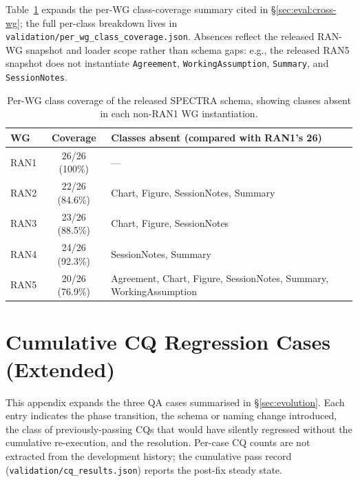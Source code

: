 Table~\ref{tab:perwg-coverage} expands the per-WG class-coverage summary cited in §\ref{sec:eval:cross-wg}; the full per-class breakdown lives in \texttt{validation/\bk per\_\bk wg\_\bk class\_\bk coverage.\bk json}. Absences reflect the released RAN-WG snapshot and loader scope rather than schema gaps: e.g., the released RAN5 snapshot does not instantiate \texttt{Agreement}, \texttt{Working\bk Assumption}, \texttt{Summary}, and \texttt{Session\bk Notes}.

\begin{table}[h]
\centering
\scriptsize
\setlength{\tabcolsep}{4pt}
\caption{Per-WG class coverage of the released SPECTRA schema, showing classes absent in each non-RAN1 WG instantiation.}
\label{tab:perwg-coverage}
\begin{tabular}{@{}lcl@{}}
\toprule
\textbf{WG} & \textbf{Coverage} & \textbf{Classes absent (compared with RAN1's 26)} \\
\midrule
RAN1 & 26/26 (100\%)   & --- \\
RAN2 & 22/26 (84.6\%)  & Chart, Figure, SessionNotes, Summary \\
RAN3 & 23/26 (88.5\%)  & Chart, Figure, SessionNotes \\
RAN4 & 24/26 (92.3\%)  & SessionNotes, Summary \\
RAN5 & 20/26 (76.9\%)  & Agreement, Chart, Figure, SessionNotes, Summary, WorkingAssumption \\
\bottomrule
\end{tabular}
\end{table}

\section{Cumulative CQ Regression Cases (Extended)}\label{app:cases}

This appendix expands the three QA cases summarised in §\ref{sec:evolution}. Each entry indicates the phase transition, the schema or naming change introduced, the class of previously-passing CQs that would have silently regressed without the cumulative re-execution, and the resolution. Per-case CQ counts are not extracted from the development history; the cumulative pass record (\texttt{validation/cq\_results.json}) reports the post-fix steady state.

